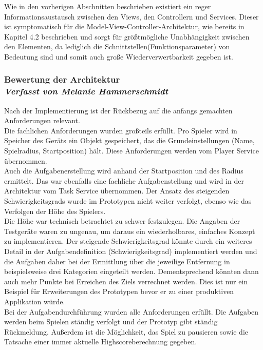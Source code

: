 Wie in den vorherigen Abschnitten beschrieben existiert ein reger Informationsaustausch zwischen den Views, den Controllern und Services. Dieser ist symptomatisch für die Model-View-Controller-Architektur, wie bereits in Kapitel 4.2 beschrieben und sorgt für größtmögliche Unabhängigkeit zwischen den Elementen, da lediglich die Schnittstellen(Funktionsparameter) von Bedeutung sind und somit auch große Wiederverwertbarkeit gegeben ist.

\subsubsection[Bewertung der Architektur]{Bewertung der Architektur
 \\ \textnormal{\small{\textit {Verfasst von Melanie Hammerschmidt}}}}
Nach der Implementierung ist der Rückbezug auf die anfangs gemachten Anforderungen relevant.
\\
Die fachlichen Anforderungen wurden großteils erfüllt. Pro Spieler wird in Speicher des Geräts ein Objekt gespeichert, das die Grundeinstellungen (Name, Spielradius, Startposition) hält. Diese Anforderungen werden vom Player Service übernommen.
\\
Auch die Aufgabenerstellung wird anhand der Startposition und des Radius ermittelt. Das war ebenfalls eine fachliche Aufgabenstellung und wird in der Architektur vom Task Service übernommen. Der Ansatz des steigenden Schwierigkeitsgrads wurde im Prototypen nicht weiter verfolgt, ebenso wie das Verfolgen der Höhe des Spielers.
\\
Die Höhe war technisch betrachtet zu schwer festzulegen. Die Angaben der Testgeräte waren zu ungenau, um daraus ein wiederholbares, einfaches Konzept zu implementieren. Der steigende Schwierigkeitsgrad könnte durch ein weiteres Detail in der Aufgabendefinition (Schwierigkeitsgrad) implementiert werden und die Aufgaben daher bei der Ermittlung über die jeweilige Entfernung in beispielsweise drei Kategorien eingeteilt werden. Dementsprechend könnten dann auch mehr Punkte bei Erreichen des Ziels verrechnet werden.
Dies ist nur ein Beispiel für Erweiterungen des Prototypen bevor er zu einer produktiven Applikation würde.
\\
Bei der Aufgabendurchführung wurden alle Anforderungen erfüllt. Die Aufgaben werden beim Spielen ständig verfolgt und der Prototyp gibt ständig Rückmeldung. Außerdem ist die Möglichkeit, das Spiel zu pausieren sowie die Tatsache einer immer aktuelle Highscoreberechnung gegeben.
\\
